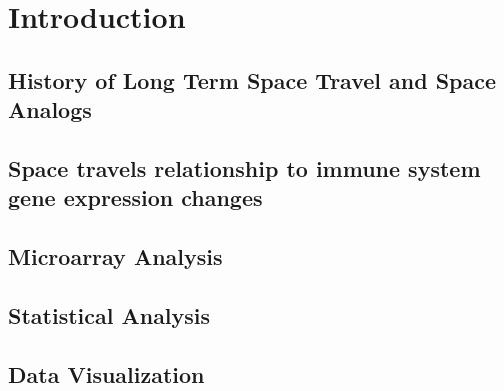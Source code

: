\chapter{Introduction}
\label{cha:intro}

\section{History of Long Term Space Travel and Space Analogs}


\section{Space travels relationship to immune system gene expression changes}


\section{Microarray Analysis}
 

\section{Statistical Analysis}


\section{Data Visualization}
